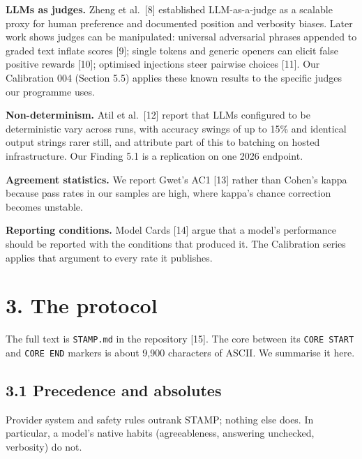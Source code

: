 \documentclass[
  11pt,
]{article}
\begin{document}
\textbf{LLMs as judges.} Zheng et al.~{[}8{]} established LLM-as-a-judge
as a scalable proxy for human preference and documented position and
verbosity biases. Later work shows judges can be manipulated: universal
adversarial phrases appended to graded text inflate scores {[}9{]};
single tokens and generic openers can elicit false positive rewards
{[}10{]}; optimised injections steer pairwise choices {[}11{]}. Our
Calibration 004 (Section 5.5) applies these known results to the
specific judges our programme uses.

\textbf{Non-determinism.} Atil et al.~{[}12{]} report that LLMs
configured to be deterministic vary across runs, with accuracy swings of
up to 15\% and identical output strings rarer still, and attribute part
of this to batching on hosted infrastructure. Our Finding 5.1 is a
replication on one 2026 endpoint.

\textbf{Agreement statistics.} We report Gwet's AC1 {[}13{]} rather than
Cohen's kappa because pass rates in our samples are high, where kappa's
chance correction becomes unstable.

\textbf{Reporting conditions.} Model Cards {[}14{]} argue that a model's
performance should be reported with the conditions that produced it. The
Calibration series applies that argument to every rate it publishes.

\hypertarget{the-protocol}{%
\section{3. The protocol}\label{the-protocol}}

The full text is \texttt{STAMP.md} in the repository {[}15{]}. The core
between its \texttt{CORE\ START} and \texttt{CORE\ END} markers is about
9,900 characters of ASCII. We summarise it here.

\hypertarget{precedence-and-absolutes}{%
\subsection{3.1 Precedence and
absolutes}\label{precedence-and-absolutes}}

Provider system and safety rules outrank STAMP; nothing else does. In
particular, a model's native habits (agreeableness, answering unchecked,
verbosity) do not.
\end{document}
